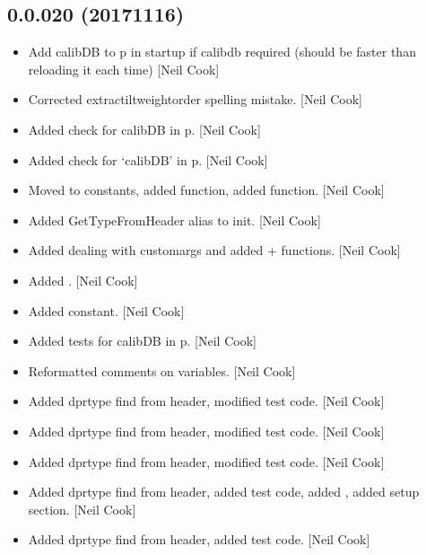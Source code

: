 \documentclass[a4paper,10pt,english]{report}
\begin{document}
\subsection{0.0.020 (2017\sphinxhyphen{}11\sphinxhyphen{}16)}
\label{\detokenize{misc/changelog:id550}}\begin{itemize}
\item {} 
Add calibDB to p in startup if calibdb required (should be faster than
reloading it each time) {[}Neil Cook{]}

\item {} 
Corrected  extractiltweightorder spelling mistake. {[}Neil Cook{]}

\item {} 
Added check for calibDB in p. {[}Neil Cook{]}

\item {} 
Added check for ‘calibDB’ in p. {[}Neil Cook{]}

\item {} 
Moved  to constants, added 
function, added  function. {[}Neil Cook{]}

\item {} 
Added GetTypeFromHeader alias to init. {[}Neil Cook{]}

\item {} 
Added dealing with customargs and added  +
 functions. {[}Neil Cook{]}

\item {} 
Added . {[}Neil Cook{]}

\item {} 
Added  constant. {[}Neil Cook{]}

\item {} 
Added tests for calibDB in p. {[}Neil Cook{]}

\item {} 
Reformatted comments on variables. {[}Neil Cook{]}

\item {} 
Added dprtype find from header, modified test code. {[}Neil Cook{]}

\item {} 
Added dprtype find from header, modified test code. {[}Neil Cook{]}

\item {} 
Added dprtype find from header, modified test code. {[}Neil Cook{]}

\item {} 
Added dprtype find from header, added test code, added , added
setup section. {[}Neil Cook{]}

\item {} 
Added dprtype find from header, added test code. {[}Neil Cook{]}

\end{itemize}
\end{document}

